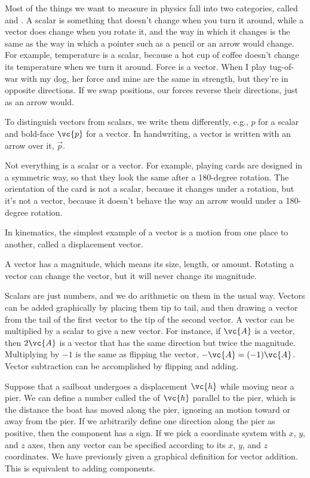 Most of the things we want to measure in physics fall into two categories,
called  and .
A scalar is something
that doesn't change when you turn it around, while a vector does change
when you rotate it, and the way in which it changes is the same as the way
in which a pointer such as a pencil or an arrow would change. For example,
temperature is a scalar, because a hot cup of coffee doesn't change its temperature
when we turn it around. Force is a vector. When I play tug-of-war with my dog,
her force and mine are the same in strength, but they're in opposite directions.
If we swap positions, our forces reverse their directions, just as an arrow would.


To distinguish vectors from scalars, we write them differently, e.g., $p$ for a scalar
and bold-face $\vc{p}$ for a vector. In handwriting, a vector is written with an arrow
over it, $\overrightarrow{p}$.

Not everything is a scalar or a vector. For example, playing cards are designed
in a symmetric way, so that they look the same after a 180-degree rotation.
The orientation of the card is not a scalar, because it changes under a rotation,
but it's not a vector, because it doesn't behave the way an arrow would under a
180-degree rotation.

In kinematics, the simplest example of a vector is a motion from one place to another,
called a displacement vector.

A vector has a magnitude, which means its size, length, or amount. Rotating a vector
can change the vector, but it will never change its magnitude.

Scalars are just numbers, and we do arithmetic on them in the usual
way.  Vectors can be added graphically by placing them tip to tail,
and then drawing a vector from the tail of the first vector to the tip
of the second vector. A vector can be multiplied by a scalar to give a new
vector. For instance, if $\vc{A}$ is a vector, then $2\vc{A}$ is a vector
that has the same direction but twice the magnitude. Multiplying by $-1$ is
the same as flipping the vector, $-\vc{A}=(-1)\vc{A}$. Vector subtraction can be
accomplished by flipping and adding.


Suppose that a sailboat undergoes a displacement $\vc{h}$ while moving near
a pier.
We can define a number called the  of $\vc{h}$ parallel to
the pier, which is the distance the boat has moved along the pier, ignoring
an motion toward or away from the pier. If we arbitrarily define one direction
along the pier as positive, then the component has a sign. If we pick a coordinate system
with $x$, $y$, and $z$ axes, then any vector can be specified according to its
$x$, $y$, and $z$ coordinates. We have previously given a graphical definition for
vector addition. This is equivalent to adding components.

